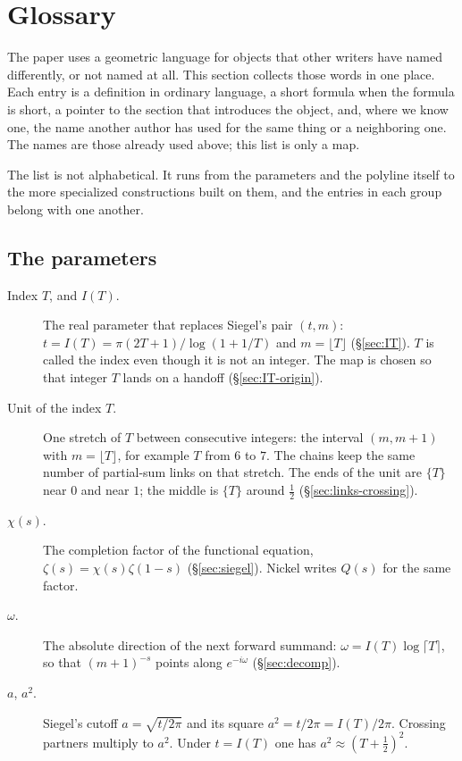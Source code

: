 \documentclass[11pt]{article}
\theoremstyle{definition}
\begin{document}
\section{Glossary}\label{sec:glossary}

The paper uses a geometric language for objects that other writers have
named differently, or not named at all. This section collects those words
in one place. Each entry is a definition in ordinary language, a short
formula when the formula is short, a pointer to the section that
introduces the object, and, where we know one, the name another author
has used for the same thing or a neighboring one. The names are those
already used above; this list is only a map.

The list is not alphabetical. It runs from the parameters and the
polyline itself to the more specialized constructions built on them,
and the entries in each group belong with one another.

\subsection*{The parameters}

\begin{description}
\item[Index $T$, and $I(T)$.]
The real parameter that replaces Siegel's pair $(t,m)$:
$t=I(T)=\pi(2T+1)/\log(1+1/T)$ and $m=\lfloor T\rfloor$
(\S\ref{sec:IT}).
$T$ is called the index even though it is not an integer.
The map is chosen so that integer $T$ lands on a handoff
(\S\ref{sec:IT-origin}).

\item[Unit of the index $T$.]
One stretch of $T$ between consecutive integers: the interval
$(m,m+1)$ with $m=\lfloor T\rfloor$, for example $T$ from $6$ to $7$.
The chains keep the same number of partial-sum links on that stretch.
The ends of the unit are $\{T\}$ near $0$ and near $1$; the middle is
$\{T\}$ around $\tfrac12$
(\S\ref{sec:links-crossing}).

\item[$\chi(s)$.]
The completion factor of the functional equation,
$\zeta(s)=\chi(s)\zeta(1-s)$
(\S\ref{sec:siegel}).
Nickel writes $Q(s)$ for the same factor.

\item[$\omega$.]
The absolute direction of the next forward summand:
$\omega=I(T)\log\lceil T\rceil$, so that $(m+1)^{-s}$ points along
$e^{-i\omega}$
(\S\ref{sec:decomp}).

\item[$a$, $a^{2}$.]
Siegel's cutoff $a=\sqrt{t/2\pi}$ and its square
$a^{2}=t/2\pi=I(T)/2\pi$.
Crossing partners multiply to $a^{2}$.
Under $t=I(T)$ one has $a^{2}\approx(T+\tfrac12)^{2}$.
\end{description}
\end{document}
